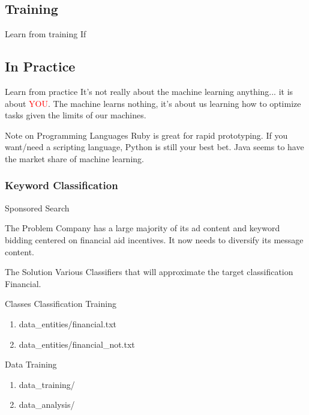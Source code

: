 \documentclass{beamer}
\begin{document}
\subsection{Training}
\begin{frame}{Learn from training}
  If
\end{frame}

\subsection{In Practice}
\begin{frame}{Learn from practice}
  It's not really about the machine learning anything... it is about \textcolor{red}{YOU}.
The machine learns nothing, it's about us learning how to optimize tasks given the limits of our machines.

\begin{exampleblock}{Note on Programming Languages}
	Ruby is great for rapid prototyping. If you want/need a scripting language, Python is still your best bet. Java seems to have the market share of machine learning.
\end{exampleblock}

\end{frame}

\subsubsection{Keyword Classification}
\begin{frame}{Sponsored Search}\label{keyword}
\begin{block}{The Problem}
	Company has a large majority of its ad content and keyword bidding centered on financial aid incentives. It now needs to diversify its message content.
\end{block}

\begin{block}{The Solution}
  Various Classifiers that will approximate the target classification Financial.
\end{block}
\end{frame}

\begin{frame}{Classes}\label{keyword_cont1}
Classification Training
\begin{enumerate}
	\item data\_entities/financial.txt
	\item data\_entities/financial\_not.txt
\end{enumerate}

Data Training
\begin{enumerate}
	\item data\_training/\*
	\item data\_analysis/\*
\end{enumerate}
\end{frame}
\end{document}
